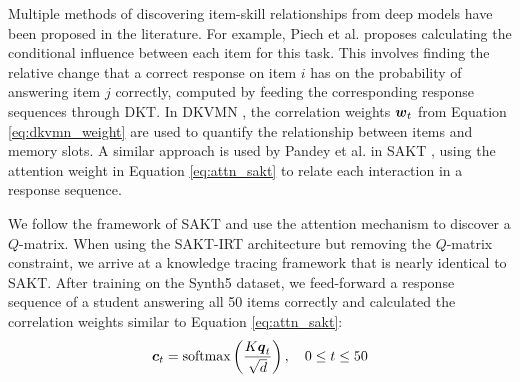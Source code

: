 Multiple methods of discovering item-skill relationships from deep models have been proposed in the literature. For example, Piech et al. \cite{piech2015} proposes calculating the conditional influence between each item for this task. This involves finding the relative change that a correct response on item $i$ has on the probability of answering item $j$ correctly, computed by feeding the corresponding response sequences through DKT. In DKVMN \cite{zhang2017}, the correlation weights $\boldsymbol{w}_t$ from Equation \ref{eq:dkvmn_weight} are used to quantify the relationship between items and memory slots. A similar approach is used by Pandey et al. in SAKT \cite{pandey2019}, using the attention weight in Equation \ref{eq:attn_sakt} to relate each interaction in a response sequence.

We follow the framework of SAKT and use the attention mechanism to discover a $Q$-matrix. When using the SAKT-IRT architecture but removing the $Q$-matrix constraint, we arrive at a knowledge tracing framework that is nearly identical to SAKT. After training on the Synth5 dataset, we feed-forward a response sequence of a student answering all 50 items correctly and calculated the correlation weights similar to Equation \ref{eq:attn_sakt}:
\begin{equation}
  \boldsymbol{c}_t = \text{softmax}\left(\frac{K \boldsymbol{q}_t}{\sqrt{d}} \right), \quad 0\leq t \leq 50
  \label{eq:q_cor_weights}
\end{equation}

